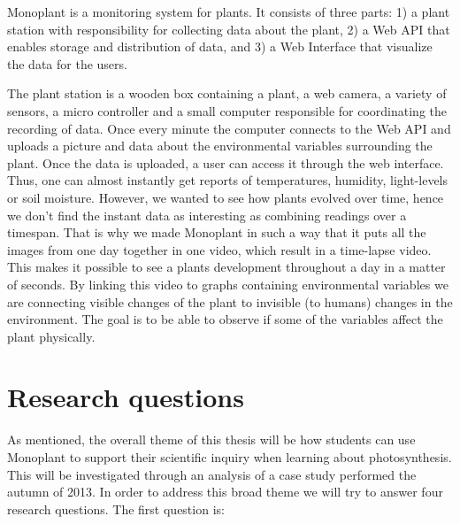 Monoplant is a monitoring system for plants. It consists of three parts: 1) a plant station with responsibility for collecting data about the plant, 2) a Web API that enables storage and distribution of data, and 3) a Web Interface that visualize the data for the users. 

The plant station is a wooden box containing a plant, a web camera, a variety of sensors, a micro controller and a small computer responsible for coordinating the recording of data. Once every minute the computer connects to the Web API and uploads a picture and data about the environmental variables surrounding the plant. Once the data is uploaded, a user can access it through the web interface. Thus, one can almost instantly get reports of temperatures, humidity, light-levels or soil moisture. However, we wanted to see how plants evolved over time, hence we don't find the instant data as interesting as combining readings over a timespan. That is why we made Monoplant in such a way that it puts all the images from one day together in one video, which result in a time-lapse video. This makes it possible to see a plants development throughout a day in a matter of seconds. By linking this video to graphs containing environmental variables we are connecting visible changes of the plant to invisible (to humans) changes in the environment. The goal is to be able to observe if some of the variables affect the plant physically. 


\section{Research questions}
As mentioned, the overall theme of this thesis will be how students can use Monoplant to support their scientific inquiry when learning about photosynthesis. This will be investigated through an analysis of a case study performed the autumn of 2013. In order to address this broad theme we will try to answer four research questions. The first question is: 

